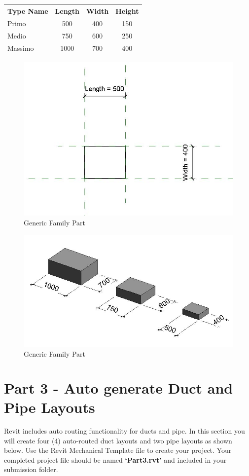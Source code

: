 \begin{tabularx}{\textwidth}{ |X|c|c|c| }
	\hline
	\textbf{Type Name} & Length & Width & Height \\
	\hline 
	Primo & 500 & 400 & 150\\
	Medio & 750 & 600 & 250\\
	Massimo & 1000 & 700 & 400\\
	\hline
\end{tabularx}


\begin{figure}[h]
	\centering
	\includegraphics[width=0.7\linewidth]{img/ParaBox1.jpg}
	\caption{Generic Family Part}
	\label{fig:GenericFamilyPart}
\end{figure}


\begin{figure}[h]
	\centering
	\includegraphics[width=0.7\linewidth]{img/ParaBox2.jpg}
	\caption{Generic Family Part}
	\label{fig:GenericFamilyPart}
\end{figure}

\newpage

\section*{Part 3 - Auto generate Duct and Pipe Layouts}
Revit includes auto routing functionality for ducts and pipe. In this section you will create four (4) auto-routed duct layouts and two pipe layouts as shown below. Use the Revit Mechanical Template file to create your project. Your completed project file should be named \textbf{‘Part3.rvt’} and included in your submission folder.

